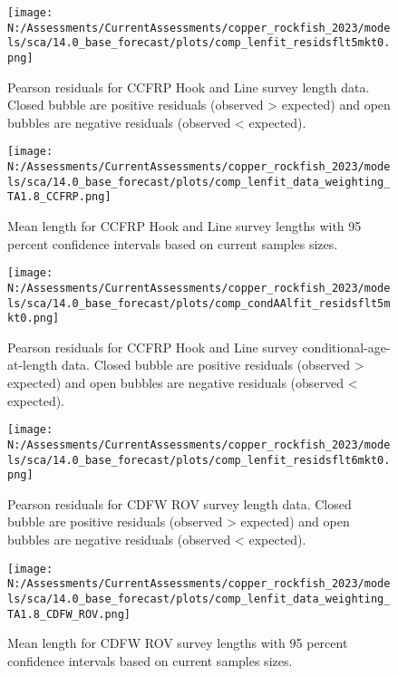 \documentclass[11pt,
  english,
  letterpaper,
]{article}
\begin{document}
\pagebreak

\begin{figure}
\centering
\texttt{[image: N:/Assessments/CurrentAssessments/copper\_rockfish\_2023/models/sca/14.0\_base\_forecast/plots/comp\_lenfit\_residsflt5mkt0.png]}
\caption{Pearson residuals for CCFRP Hook and Line survey length data. Closed bubble are positive residuals (observed \textgreater{} expected) and open bubbles are negative residuals (observed \textless{} expected).\label{fig:ccfrp-len-pearson}}
\end{figure}

\pagebreak

\begin{figure}
\centering
\texttt{[image: N:/Assessments/CurrentAssessments/copper\_rockfish\_2023/models/sca/14.0\_base\_forecast/plots/comp\_lenfit\_data\_weighting\_TA1.8\_CCFRP.png]}
\caption{Mean length for CCFRP Hook and Line survey lengths with 95 percent confidence intervals based on current samples sizes.\label{fig:ccfrp-mean-len-fit}}
\end{figure}

\pagebreak

\begin{figure}
\centering
\texttt{[image: N:/Assessments/CurrentAssessments/copper\_rockfish\_2023/models/sca/14.0\_base\_forecast/plots/comp\_condAAlfit\_residsflt5mkt0.png]}
\caption{Pearson residuals for CCFRP Hook and Line survey conditional-age-at-length data. Closed bubble are positive residuals (observed \textgreater{} expected) and open bubbles are negative residuals (observed \textless{} expected).\label{fig:ccfrp-age-pearson}}
\end{figure}

\pagebreak

\begin{figure}
\centering
\texttt{[image: N:/Assessments/CurrentAssessments/copper\_rockfish\_2023/models/sca/14.0\_base\_forecast/plots/comp\_lenfit\_residsflt6mkt0.png]}
\caption{Pearson residuals for CDFW ROV survey length data. Closed bubble are positive residuals (observed \textgreater{} expected) and open bubbles are negative residuals (observed \textless{} expected).\label{fig:rov-pearson}}
\end{figure}

\pagebreak

\begin{figure}
\centering
\texttt{[image: N:/Assessments/CurrentAssessments/copper\_rockfish\_2023/models/sca/14.0\_base\_forecast/plots/comp\_lenfit\_data\_weighting\_TA1.8\_CDFW\_ROV.png]}
\caption{Mean length for CDFW ROV survey lengths with 95 percent confidence intervals based on current samples sizes.\label{fig:rov-mean-len-fit}}
\end{figure}
\end{document}
